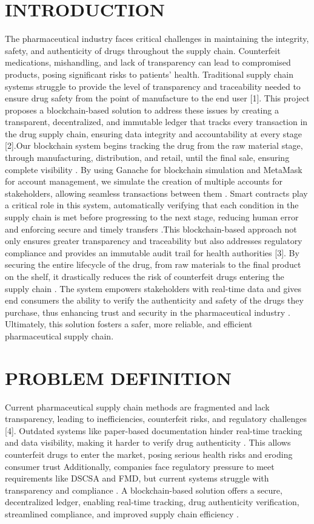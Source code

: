 \documentclass[runningheads]{llncs}
\begin{document}
\section{INTRODUCTION}
The pharmaceutical industry faces critical challenges in maintaining the integrity, safety, and authenticity of drugs throughout the supply chain. Counterfeit medications, mishandling, and lack of transparency can lead to compromised products, posing significant risks to patients’ health. Traditional supply chain systems struggle to provide the level of transparency and traceability needed to ensure drug safety from the point of manufacture to the end user [1]. This project proposes a blockchain-based solution to address these issues by creating a transparent, decentralized, and immutable ledger that tracks every transaction in the drug supply chain, ensuring data integrity and accountability at every stage [2].Our blockchain system begins tracking the drug from the raw material stage, through manufacturing, distribution, and retail, until the final sale, ensuring complete visibility . By using Ganache for blockchain simulation and MetaMask for account management, we simulate the creation of multiple accounts for stakeholders, allowing seamless transactions between them . Smart contracts play a critical role in this system, automatically verifying that each condition in the supply chain is met before progressing to the next stage, reducing human error and enforcing secure and timely transfers .This blockchain-based approach not only ensures greater transparency and traceability but also addresses regulatory compliance and provides an immutable audit trail for health authorities [3]. By securing the entire lifecycle of the drug, from raw materials to the final product on the shelf, it drastically reduces the risk of counterfeit drugs entering the supply chain . The system empowers stakeholders with real-time data and gives end consumers the ability to verify the authenticity and safety of the drugs they purchase, thus enhancing trust and security in the pharmaceutical industry . Ultimately, this solution fosters a safer, more reliable, and efficient pharmaceutical supply chain.


\section{PROBLEM DEFINITION}

Current pharmaceutical supply chain methods are fragmented and lack transparency, leading to inefficiencies, counterfeit risks, and regulatory challenges [4]. Outdated systems like paper-based documentation hinder real-time tracking and data visibility, making it harder to verify drug authenticity . This allows counterfeit drugs to enter the market, posing serious health risks and eroding consumer trust  Additionally, companies face regulatory pressure to meet requirements like DSCSA and FMD, but current systems struggle with transparency and compliance . A blockchain-based solution offers a secure, decentralized ledger, enabling real-time tracking, drug authenticity verification, streamlined compliance, and improved supply chain efficiency .
\end{document}
